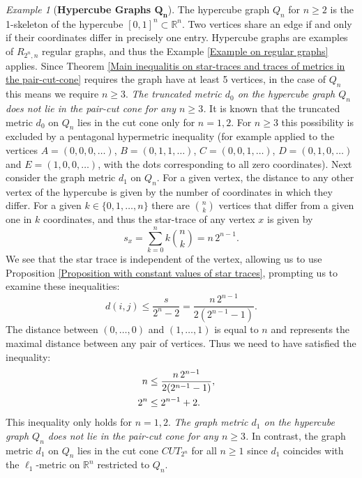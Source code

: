 \documentclass[12pt]{amsart}
\numberwithin{theorem}{section}
\theoremstyle{remark}
\newtheorem{example}[theorem]{Example}
\begin{document}
\vskip3mm
\begin{example}[{\bf Hypercube Graphs $\mathbf{Q_n}$}] \label{Hypercube graphs for the pair-cut cone section}
The hypercube graph $Q_n$ for $n\ge 2$ is the 1-skeleton of the hypercube $[0,1]^n\subset \mathbb R^n$. Two vertices share an edge if and only if their coordinates differ in precisely one entry. Hypercube graphs are examples of $R_{2^n, n}$ regular graphs, and thus the Example \ref{Example on regular graphs} applies. Since Theorem \ref{Main inequalitis on star-traces and traces of metrics in the pair-cut-cone} requires the graph have at least 5 vertices, in the case of $Q_n$ this means we require $n\ge 3$. 
\vskip2mm
 {\em The truncated metric $d_0$ on the hypercube graph $Q_n$ does not lie in the pair-cut cone for any $n\ge 3$.}  
\vskip2mm
It is known that the truncated metric $d_0$ on $Q_n$ lies in the cut cone only for $n= 1, 2$. For $n\ge 3$ this possibility is excluded by a pentagonal hypermetric inequality (for example applied to the vertices $A=(0,0,0,\dots)$, $B=(0,1,1,\dots)$, $C=(0,0,1,\dots)$, $D=(0,1,0,\dots)$ and $E=(1,0,0,\dots)$, with the dots corresponding to all zero coordinates).   
\vskip3mm 
Next consider the graph metric $d_1$ on $Q_n$. For a given vertex, the distance to any other vertex of the hypercube is given by the number of coordinates in which they differ. For a given $k\in \{0,1,\dots, n\}$ there are ${n\choose k}$ vertices that differ from a given one in $k$ coordinates, and thus the star-trace of any vertex $x$ is given by
$$s_x = \sum _{k=0}^n k{n\choose k} = n\,2^{n-1}.$$ 
We see that the star trace is independent of the vertex, allowing us to use Proposition \ref{Proposition with constant values of star traces}, prompting us to examine these inequalities:
$$ d(i,j) \le \frac{s}{2^n-2} = \frac{n\, 2^{n-1}}{2(2^{n-1}-1)}. $$
The distance between $(0,\dots, 0)$ and $(1,\dots, 1)$ is equal to $n$ and represents the maximal distance between any pair of vertices. Thus we need to have satisfied the inequality:
\begin{align*}
n & \le  \frac{n\, 2^{n-1}}{2(2^{n-1}-1)}, \cr
2^n & \le 2^{n-1}+2.
\end{align*}
This inequality only holds for $n=1,2$. 
\vskip2mm
 {\em The graph metric $d_1$ on the hypercube graph $Q_n$ does not lie in the pair-cut cone for any $n\ge 3$.}
\vskip2mm
In contrast, the graph metric $d_1$ on $Q_n$ lies in the cut cone $CUT_{2^n}$ for all $n\ge 1$ since $d_1$ coincides with the $\ell_1$-metric on $\mathbb R^n$ restricted to $Q_n$.     
\end{example} 
\end{document}
